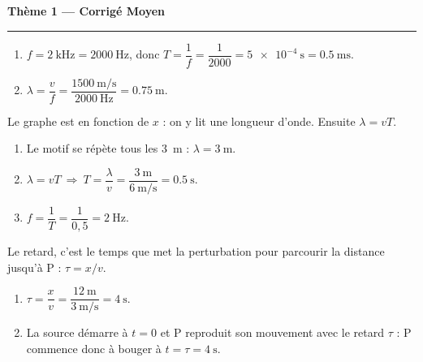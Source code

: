 \documentclass[11pt,a4paper]{article}
\begin{document}
\begin{center}
{\large\bfseries\color{excol} Thème 1 — Corrigé Moyen}\\[-2pt]
{\color{excol}\rule{5cm}{1pt}}
\end{center}

\begin{corrige}
\begin{enumerate}[label=\alph*)]
  \item $f=\SI{2}{\kilo\hertz}=\SI{2000}{\hertz}$, donc
        $T=\dfrac{1}{f}=\dfrac{1}{2000}=\SI{5e-4}{\second}=\SI{0.5}{\milli\second}.$
  \item $\lambda=\dfrac{v}{f}=\dfrac{\SI{1500}{\metre\per\second}}{\SI{2000}{\hertz}}
        =\SI{0.75}{\metre}.$
\end{enumerate}
\end{corrige}

\begin{corrige}
Le graphe est en fonction de $x$ : on y lit une longueur d'onde. Ensuite $\lambda=vT$.
\begin{enumerate}[label=\alph*)]
  \item Le motif se répète tous les \SI{3}{\metre} : $\lambda=\SI{3}{\metre}.$
  \item $\lambda=vT\ \Rightarrow\ T=\dfrac{\lambda}{v}=\dfrac{\SI{3}{\metre}}{\SI{6}{\metre\per\second}}
        =\SI{0.5}{\second}.$
  \item $f=\dfrac{1}{T}=\dfrac{1}{0{,}5}=\SI{2}{\hertz}.$
\end{enumerate}
\end{corrige}

\begin{corrige}
Le retard, c'est le temps que met la perturbation pour parcourir la distance jusqu'à P :
$\tau=x/v$.
\begin{enumerate}[label=\alph*)]
  \item $\tau=\dfrac{x}{v}=\dfrac{\SI{12}{\metre}}{\SI{3}{\metre\per\second}}=\SI{4}{\second}.$
  \item La source démarre à $t=0$ et P reproduit son mouvement avec le retard $\tau$ : P
        commence donc à bouger à $t=\tau=\SI{4}{\second}$.
\end{enumerate}
\end{corrige}
\end{document}

